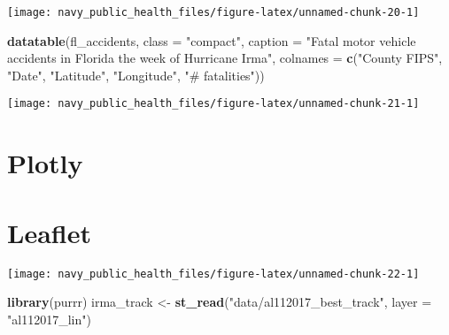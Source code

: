 \documentclass[]{tufte-book}
\newenvironment{Shaded}{}{}
\newcommand{\DataTypeTok}[1]{\textcolor[rgb]{0.56,0.13,0.00}{#1}}
\newcommand{\KeywordTok}[1]{\textcolor[rgb]{0.00,0.44,0.13}{\textbf{#1}}}
\newcommand{\NormalTok}[1]{#1}
\newcommand{\OperatorTok}[1]{\textcolor[rgb]{0.40,0.40,0.40}{#1}}
\newcommand{\StringTok}[1]{\textcolor[rgb]{0.25,0.44,0.63}{#1}}
\begin{document}
\texttt{[image: navy\_public\_health\_files/figure-latex/unnamed-chunk-20-1]}

\begin{Shaded}
\begin{Highlighting}[]
\KeywordTok{datatable}\NormalTok{(fl_accidents, }\DataTypeTok{class =} \StringTok{"compact"}\NormalTok{, }\DataTypeTok{caption =} \StringTok{"Fatal motor vehicle accidents in Florida the week of Hurricane Irma"}\NormalTok{, }
    \DataTypeTok{colnames =} \KeywordTok{c}\NormalTok{(}\StringTok{"County FIPS"}\NormalTok{, }\StringTok{"Date"}\NormalTok{, }\StringTok{"Latitude"}\NormalTok{, }
        \StringTok{"Longitude"}\NormalTok{, }\StringTok{"# fatalities"}\NormalTok{))}
\end{Highlighting}
\end{Shaded}

\texttt{[image: navy\_public\_health\_files/figure-latex/unnamed-chunk-21-1]}

\hypertarget{plotly}{%
\section{Plotly}\label{plotly}}

\hypertarget{leaflet}{%
\section{Leaflet}\label{leaflet}}

\begin{Shaded}
\end{Shaded}

\texttt{[image: navy\_public\_health\_files/figure-latex/unnamed-chunk-22-1]}

\begin{Shaded}
\begin{Highlighting}[]
\KeywordTok{library}\NormalTok{(purrr)}
\NormalTok{irma_track <-}\StringTok{ }\KeywordTok{st_read}\NormalTok{(}\StringTok{"data/al112017_best_track"}\NormalTok{, }
    \DataTypeTok{layer =} \StringTok{"al112017_lin"}\NormalTok{)}
\end{Highlighting}
\end{Shaded}
\end{document}
